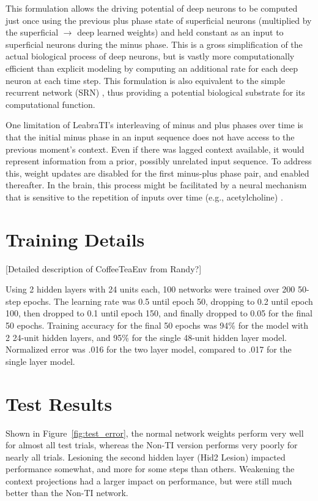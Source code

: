 \documentclass[10pt,letterpaper]{article}
\numberwithin{equation}{section}
\begin{document}
This formulation allows the driving potential of deep neurons to be computed just once using the previous plus phase state of superficial neurons (multiplied by the superficial $\rightarrow$ deep learned weights) and held constant as an input to superficial neurons during the minus phase. This is a gross simplification of the actual biological process of deep neurons, but is vastly more computationally efficient than explicit modeling by computing an additional rate for each deep neuron at each time step. This formulation is also equivalent to the simple recurrent network (SRN) \cite{Elman:1990,Servan-Schreiber:1991}, thus providing a potential biological substrate for its computational function. 

One limitation of LeabraTI's interleaving of minus and plus phases over time is that the initial minus phase in an input sequence does not have access to the previous moment's  context. Even if there was lagged context available, it would represent information from a prior, possibly unrelated input sequence. To address this, weight updates are disabled for the first minus-plus phase pair, and enabled thereafter. In the brain, this process might be facilitated by a neural mechanism that is sensitive to the repetition of inputs over time (e.g., acetylcholine) \cite{Thiel:2001,Thiel:2002}.


\section{Training Details}

[Detailed description of CoffeeTeaEnv from Randy?]

Using 2 hidden layers with 24 units each, 100 networks were trained over 200 50-step epochs. The learning rate was 0.5 until epoch 50, dropping to 0.2 until epoch 100, then dropped to 0.1 until epoch 150, and finally dropped to 0.05 for the final 50 epochs. Training accuracy for the final 50 epochs was 94\% for the model with 2 24-unit hidden layers, and 95\% for the single 48-unit hidden layer model. Normalized error was .016 for the two layer model, compared to .017 for the single layer model.

\section{Test Results}

Shown in Figure~\ref{fig:test_error}, the normal network weights perform very well for almost all test trials, whereas the Non-TI version performs very poorly for nearly all trials. Lesioning the second hidden layer (Hid2 Lesion) impacted performance somewhat, and more for some steps than others. Weakening the context projections had a larger impact on performance, but were still much better than the Non-TI network.
\end{document}
